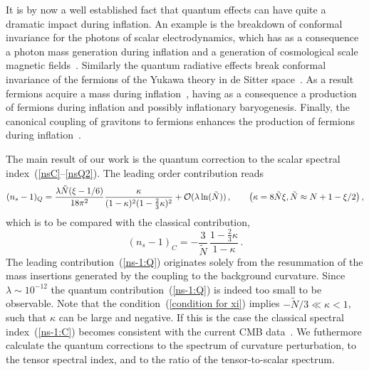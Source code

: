  It is by now a well established fact that quantum effects can
have quite a dramatic impact during inflation. An example is
the breakdown of conformal invariance for the photons
of scalar electrodynamics,
which has as a consequence a photon mass generation during inflation and
a generation of cosmological scale magnetic fields~\cite{Prokopec:PhotonMass}.
Similarly the quantum radiative effects break conformal invariance of the
fermions of the Yukawa theory in de Sitter space~\cite{ProkopecWoodard:2003}.
As a result fermions acquire a mass during
inflation~\cite{ProkopecWoodard:2003,Garbrecht:2006jm}, having as a consequence
a production of fermions during inflation and possibly
inflationary baryogenesis. Finally, the canonical coupling of gravitons
to fermions enhances the production of fermions during
inflation~\cite{MiaoWoodard:2005+2006}.

 The main result of our work is the quantum correction to
the scalar spectral index~(\ref{nsC}--\ref{nsQ2}).
The leading order contribution reads
\begin{equation}
(n_s-1)_Q = \frac{\lambda\tilde{N}(\xi-1/6)}{18\pi^2}\frac{\kappa}{(1-\kappa)^2(1-\frac23\kappa)^2} +{\cal O}(\lambda \ln(\tilde N))
\,,\qquad
\big(\kappa = 8\tilde N\xi, \tilde N\approx N+1-\xi/2\big)
\label{ns-1:Q}
\,,
\end{equation}
which is to be compared with the classical contribution,
\begin{equation}
(n_s-1)_C = -\frac{3}{\tilde N}\,\frac{1-\frac23\kappa}{1-\kappa}
\label{ns-1:C}
\,.
\end{equation}
The leading contribution~(\ref{ns-1:Q}) originates solely from the resummation
of the mass insertions generated by the coupling to the background curvature.
Since $\lambda \sim 10^{-12}$ the quantum contribution~(\ref{ns-1:Q})
is indeed too small to be observable. Note that the
condition~(\ref{condition for xi}) implies $-\tilde N/3\ll \kappa<1$,
such that $\kappa$ can be large and negative. If this is the case
the classical spectral index~(\ref{ns-1:C}) becomes consistent with
the current CMB data~\cite{Spergel:2006}.
We futhermore calculate the quantum corrections to the spectrum of curvature
perturbation, to the tensor spectral index, and to the ratio
of the tensor-to-scalar spectrum.

